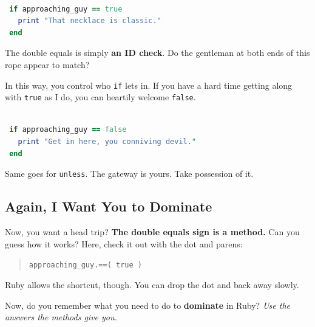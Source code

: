 \documentclass[10pt,twoside]{report}
\begin{document}
\begin{lstlisting}[basicstyle=\ttfamily\color{basiccolor},
    commentstyle = \ttfamily\color{commentcolor},
    keywordstyle=\ttfamily\color{keywordscolor},
    stringstyle=\color{stringcolor},
    language=Ruby,
    basicstyle=\small\ttfamily,
    showstringspaces=false,
  ]

 if approaching_guy == true 
   print "That necklace is classic."  
 end

\end{lstlisting}


The double equals is simply {\bf an ID check}.  Do the gentleman at
both ends of this rope appear to match?

In this way, you control who \lstinline[breaklines=true]|if| lets in.
If you have a hard time getting along with
\lstinline[breaklines=true]|true| as I do, you can heartily welcome
\lstinline[breaklines=true]|false|.


\begin{lstlisting}[basicstyle=\ttfamily\color{basiccolor},
    commentstyle = \ttfamily\color{commentcolor},
    keywordstyle=\ttfamily\color{keywordscolor},
    stringstyle=\color{stringcolor},
    language=Ruby,
    basicstyle=\small\ttfamily,
    showstringspaces=false,
  ]

 if approaching_guy == false 
   print "Get in here, you conniving devil."
 end

\end{lstlisting}


Same goes for \lstinline[breaklines=true]|unless|.  The gateway is
yours.  Take possession of it.



\subsection{Again, I Want You to Dominate}



Now, you want a head trip?  {\bf The double equals sign is a method.}
Can you guess how it works?  Here, check it out with the dot and
parens:

\begin{quote}
\lstinline[breaklines=true]|approaching_guy.==( true )|\end{quote}


Ruby allows the shortcut, though.  You can drop the dot and back away
slowly.

Now, do you remember what you need to do to {\bf dominate} in Ruby?
{\em Use the answers the methods give you.}
\end{document}
